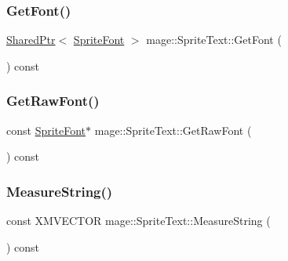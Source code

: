 \hypertarget{classmage_1_1_sprite_text_a1c80933525f87fe4dced9479c1b79764}{}\label{classmage_1_1_sprite_text_a1c80933525f87fe4dced9479c1b79764} 
\subsubsection{\texorpdfstring{Get\+Font()}{GetFont()}}
{\footnotesize\ttfamily \hyperlink{namespacemage_a1e01ae66713838a7a67d30e44c67703e}{Shared\+Ptr}$<$ \hyperlink{classmage_1_1_sprite_font}{Sprite\+Font} $>$ mage\+::\+Sprite\+Text\+::\+Get\+Font (\begin{DoxyParamCaption}{ }\end{DoxyParamCaption}) const}

\hypertarget{classmage_1_1_sprite_text_ab67ba17af1b19766343d04f10853c8d6}{}\label{classmage_1_1_sprite_text_ab67ba17af1b19766343d04f10853c8d6} 
\subsubsection{\texorpdfstring{Get\+Raw\+Font()}{GetRawFont()}}
{\footnotesize\ttfamily const \hyperlink{classmage_1_1_sprite_font}{Sprite\+Font}$\ast$ mage\+::\+Sprite\+Text\+::\+Get\+Raw\+Font (\begin{DoxyParamCaption}{ }\end{DoxyParamCaption}) const\hspace{0.3cm}{\ttfamily [protected]}}

\hypertarget{classmage_1_1_sprite_text_a72f926162887270cef780251561a2155}{}\label{classmage_1_1_sprite_text_a72f926162887270cef780251561a2155} 
\subsubsection{\texorpdfstring{Measure\+String()}{MeasureString()}}
{\footnotesize\ttfamily const X\+M\+V\+E\+C\+T\+OR mage\+::\+Sprite\+Text\+::\+Measure\+String (\begin{DoxyParamCaption}{ }\end{DoxyParamCaption}) const}

